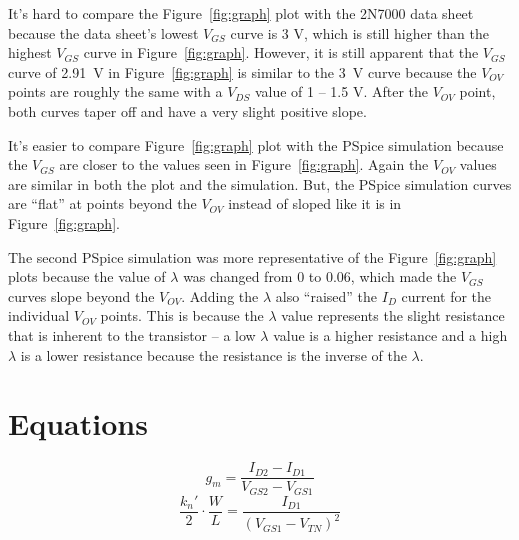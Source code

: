 It’s hard to compare the Figure~\ref{fig:graph} plot with the 2N7000 data sheet because the data sheet’s lowest $V_{GS}$ curve is 3 V, which is still higher than the highest $V_{GS}$ curve in Figure~\ref{fig:graph}. However, it is still apparent that the $V_{GS}$ curve of \SI{2.91}{V} in Figure~\ref{fig:graph} is similar to the \SI{3}{V} curve because the $V_{OV}$ points are roughly the same with a $V_{DS}$ value of 1 – 1.5 V. After the $V_{OV}$ point, both curves taper off and have a very slight positive slope.

It’s easier to compare Figure~\ref{fig:graph} plot with the PSpice simulation because the $V_{GS}$ are closer to the values seen in Figure~\ref{fig:graph}. Again the $V_{OV}$ values are similar in both the plot and the simulation. But, the PSpice simulation curves are “flat” at points beyond the $V_{OV}$ instead of sloped like it is in Figure~\ref{fig:graph}.

The second PSpice simulation was more representative of the Figure~\ref{fig:graph} plots because the value of $\lambda$ was changed from 0 to 0.06, which made the $V_{GS}$ curves slope beyond the $V_{OV}$. Adding the $\lambda$ also “raised” the $I_D$ current for the individual $V_{OV}$ points. This is because the $\lambda$ value represents the slight resistance that is inherent to the transistor – a low $\lambda$ value is a higher resistance and a high $\lambda$ is a lower resistance because the resistance is the inverse of the $\lambda$.

\section{Equations}
\label{sec:equations}

%
\begin{equation}
  \label{eq:transconduct}
  g_m = \frac{I_{D2}-I_{D1}}{V_{GS2}-V_{GS1}}
\end{equation}
%
\begin{equation}
  \label{eq:phys}
  \frac{k_n'}{2} \cdot \frac{W}{L} = \frac{I_{D1}}{(V_{GS1} - V_{TN})^2}
\end{equation}


